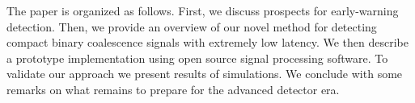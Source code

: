 The paper is organized as follows.  First, we discuss prospects for early-warning
detection.  Then, we provide an overview of our novel method for detecting compact
binary coalescence signals with extremely low latency. We then describe a prototype
implementation using open source signal processing software.  To validate our approach
we present results of simulations.  We conclude with some remarks on what remains to
prepare for the advanced detector era.
